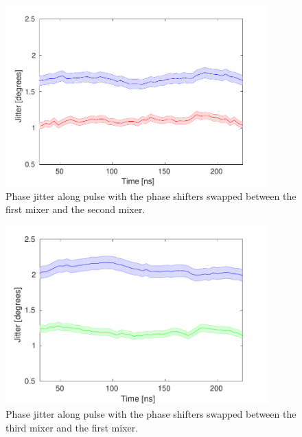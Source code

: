 \begin{figure}
  \centering
  \includegraphics[width=0.9\textwidth]{Figures/phaseMons/Mix1Mon1PhShft2_Mix2Mon2PhShft1}
  \caption{Phase jitter along pulse with the phase shifters swapped between the first mixer and the second mixer.}
  \label{f:Mix1Mon1PhShft2_Mix2Mon2PhShft1}
\end{figure}

\begin{figure}
  \centering
  \includegraphics[width=0.9\textwidth]{Figures/phaseMons/Mix1Mon1PhShft3_Mix3Mon2PhShft1}
  \caption{Phase jitter along pulse with the phase shifters swapped between the third mixer and the first mixer.}
  \label{f:Mix1Mon1PhShft3_Mix3Mon2PhShft1}
\end{figure}

